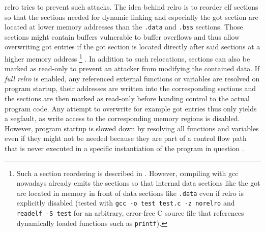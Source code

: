 \gls{relro} tries to prevent such attacks.
The idea behind \gls{relro} is to reorder \gls{elf} sections so that the sections needed for dynamic linking and especially the \gls{got} section are located at lower memory addresses than the \texttt{.data} and \texttt{.bss} sections.
Those sections might contain buffers vulnerable to buffer overflows and thus allow overwriting \gls{got} entries if the \gls{got} section is located directly after said sections at a higher memory address%
	\footnote{
		Such a section reordering is described in \cite[183]{Klein2011}.
		However, compiling with \gls{gcc} nowadays already emits the sections so that internal data sections like the \gls{got} are located in memory in front of data sections like \texttt{.data} even if \gls{relro} is explicitly disabled (tested with \texttt{gcc -o test test.c -z norelro} and \texttt{readelf -S test} for an arbitrary, error-free C source file that references dynamically loaded functions such as \texttt{printf}).
	}%
.
In addition to such relocations, sections can also be marked as read-only to prevent an attacker from modifying the contained data.
If \emph{full \gls{relro}} is enabled, any referenced external functions or variables are resolved on program startup, their addresses are written into the corresponding sections and the sections are then marked as read-only before handing control to the actual program code.
Any attempt to overwrite for example \gls{got} entries thus only yields a \gls{segfault}, as write access to the corresponding memory regions is disabled.
However, program startup is slowed down by resolving all functions and variables even if they might not be needed because they are part of a control flow path that is never executed in a specific instantiation of the program in question \cites[645\psqq]{Federico2015}[183\psqq]{Klein2011}{Sidhpurwala2019}.

